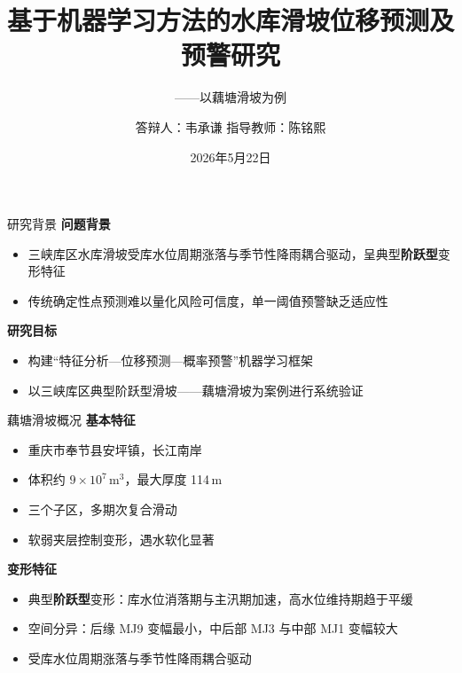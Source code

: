 \documentclass[aspectratio=169,12pt]{beamer}
\title{基于机器学习方法的水库滑坡位移预测及预警研究}
\subtitle{——以藕塘滑坡为例}
\author{答辩人：韦承谦 \quad 指导教师：陈铭熙}
\institute{}
\date{\vspace{1.5em}2026年5月22日}
\begin{document}
\maketitle

\begin{frame}{研究背景}
  \textbf{问题背景}
  \begin{itemize}
    \item 三峡库区水库滑坡受\alert{库水位周期涨落}与\alert{季节性降雨}耦合驱动，呈典型\textbf{阶跃型}变形特征
    \item 传统确定性点预测难以量化风险可信度，单一阈值预警缺乏适应性
  \end{itemize}
  \vspace{0.2em}
  \textbf{研究目标}
  \begin{itemize}
    \item 构建``特征分析—位移预测—概率预警''机器学习框架
    \item 以三峡库区典型阶跃型滑坡——藕塘滑坡为案例进行系统验证
  \end{itemize}
\end{frame}

\begin{frame}{藕塘滑坡概况}
  \textbf{基本特征}
  \begin{itemize}
    \item 重庆市奉节县安坪镇，长江南岸
    \item 体积约 $9\times10^7\,\text{m}^3$，最大厚度 114\,m
    \item 三个子区，多期次复合滑动
    \item 软弱夹层控制变形，遇水软化显著
  \end{itemize}
  \vspace{0.8em}
  \textbf{变形特征}
  \begin{itemize}
    \item 典型\textbf{阶跃型}变形：库水位消落期与主汛期加速，高水位维持期趋于平缓
    \item 空间分异：后缘 MJ9 变幅最小，中后部 MJ3 与中部 MJ1 变幅较大
    \item 受库水位周期涨落与季节性降雨耦合驱动
  \end{itemize}
\end{frame}
\end{document}
